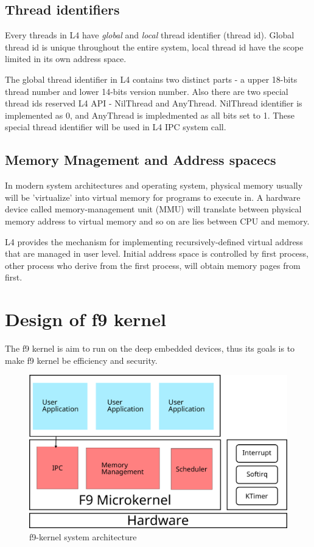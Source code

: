\documentclass[10pt,preprint,nocopyrightspace]{sigplanconf}
\begin{document}
\subsection{Thread identifiers}

Every threads in L4 have \textit{global} and \textit{local} thread identifier (thread id). Global thread id is unique throughout the entire system, local thread id have the scope limited in its own address space.

The global thread identifier in L4 contains two distinct parts - a upper 18-bits thread number and lower 14-bits version number. Also there are two special thread ids reserved L4 API - NilThread and AnyThread. NilThread identifier is implemented as 0, and AnyThread is impledmented as all bits set to 1. These special thread identifier will be used in L4 IPC system call\cite{nourai2005aphysically}.

\subsection{Memory Mnagement and Address spacecs }

In modern system architectures and operating system, physical memory usually will be 'virtualize' into virtual memory for programs to execute in\cite{arpaci2015operating}. A hardware device called memory-management unit (MMU) will translate between physical memory address to virtual memory and so on are lies between CPU and memory.

L4 provides the mechanism for implementing recursively-defined virtual address that are managed in user level\cite{dannowski2011l4}. Initial address space is controlled by first process, other process who derive from the first process, will obtain memory pages from first.

\section{Design of f9 kernel}

The f9 kernel is aim to run on the deep embedded devices, thus its goals is to make f9 kernel be efficiency and security.

\begin{figure}[H]
	\begin{center}
		\includegraphics[width=\linewidth]{picture/f9_arch.png}
	\end{center}
	\caption{f9-kernel system architecture}
	\label{fig:f9}
\end{figure}
\end{document}
